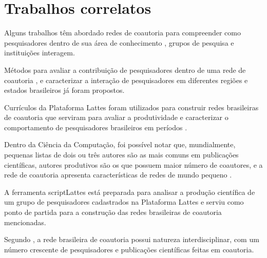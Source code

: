 \chapter[Trabalhos correlatos]{Trabalhos correlatos}

Alguns trabalhos têm abordado redes de coautoria para compreender como pesquisadores dentro de sua área de conhecimento \cite{mena2014brazilian} \cite{franceschet2011collaboration} \cite{santin2016collaboration}, grupos de pesquisa \cite{delgado2014analyzing} e instituições \cite{ioannidis2008measuring} interagem.

Métodos para avaliar a contribuição de pesquisadores dentro de uma rede de coautoria \cite{liu2005co} \cite{franceschet2011collaboration}, e caracterizar a interação de pesquisadores em diferentes regiões e estados brasileiros \cite{sidone2016ciencia} já foram propostos.

Currículos da Plataforma Lattes foram utilizados para construir redes brasileiras de coautoria que serviram para avaliar a produtividade e caracterizar o comportamento de pesquisadores brasileiros em períodos \cite{mena2014brazilian}.

Dentro da Ciência da Computação, foi possível notar que, mundialmente, pequenas listas de dois ou três autores são as mais comuns em publicações científicas, autores produtivos são os que possuem maior número de coautores, e a rede de coautoria apresenta características de redes de mundo pequeno \cite{franceschet2011collaboration}.

A ferramenta scriptLattes \cite{mena2009scriptlattes} está preparada para analisar a produção científica de um grupo de pesquisadores cadastrados na Plataforma Lattes \cite{mena2013prospecccao} e serviu como ponto de partida para a construção das redes brasileiras de coautoria mencionadas.

Segundo , a rede brasileira de coautoria possui natureza interdisciplinar, com um número crescente de pesquisadores e publicações científicas feitas em coautoria.
